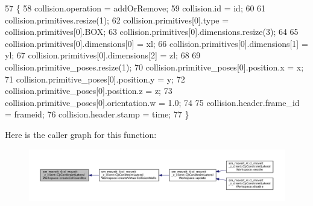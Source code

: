 \begin{DoxyCode}
57         \{
58             collision.operation = addOrRemove;
59             collision.id = id;
60 
61             collision.primitives.resize(1);
62             collision.primitives[0].type = collision.primitives[0].BOX;
63             collision.primitives[0].dimensions.resize(3);
64 
65             collision.primitives[0].dimensions[0] = xl;
66             collision.primitives[0].dimensions[1] = yl;
67             collision.primitives[0].dimensions[2] = zl;
68 
69             collision.primitive\_poses.resize(1);
70             collision.primitive\_poses[0].position.x = x;
71             collision.primitive\_poses[0].position.y = y;
72             collision.primitive\_poses[0].position.z = z;
73             collision.primitive\_poses[0].orientation.w = 1.0;
74 
75             collision.header.frame\_id = frameid;
76             collision.header.stamp = time;
77         \}
\end{DoxyCode}
Here is the caller graph for this function\+:
\nopagebreak
\begin{figure}[H]
\begin{center}
\leavevmode
\includegraphics[width=350pt]{classsm__moveit__4_1_1cl__moveit__z__client_1_1CpConstraintLateralWorkspace_ac27089379dc98fbecf699b18e0797aba_icgraph}
\end{center}
\end{figure}
\mbox{\label{classsm__moveit__4_1_1cl__moveit__z__client_1_1CpConstraintLateralWorkspace_abb413c4d73a4f6c7f2feca86624b5c7a}} 
